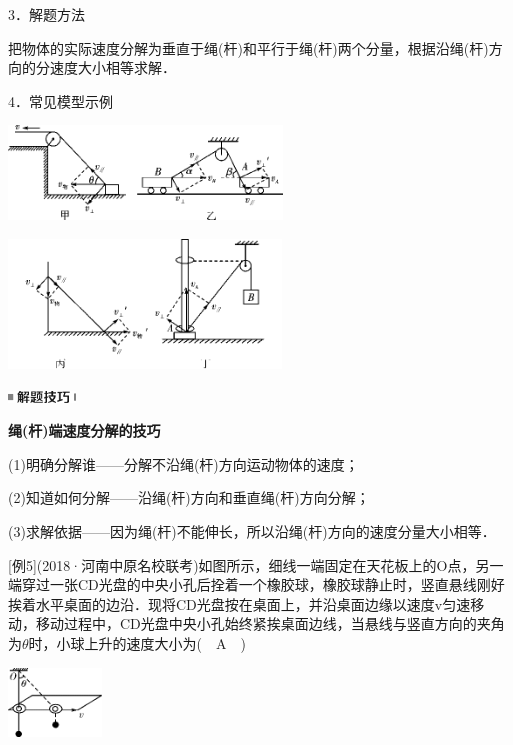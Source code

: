 \documentclass[cn,10.5pt,chinese,mac,chinesefont=founder]{elegantbook}
\begin{document}
3．解题方法

把物体的实际速度分解为垂直于绳(杆)和平行于绳(杆)两个分量，根据沿绳(杆)方向的分速度大小相等求解．

4．常见模型示例

\begin{center}\includegraphics[width=2.86458in,height=0.98958in]{media/image151.png}\end{center}
\begin{center}\includegraphics[width=2.85417in,height=1.35417in]{media/image152.png}\end{center}
\begin{center}\includegraphics[width=0.70833in,height=0.125in]{media/image37.png}

\textbf{绳(杆)端速度分解的技巧}
\end{center}


(1)明确分解谁------分解不沿绳(杆)方向运动物体的速度；

(2)知道如何分解------沿绳(杆)方向和垂直绳(杆)方向分解；

(3)求解依据------因为绳(杆)不能伸长，所以沿绳(杆)方向的速度分量大小相等．

{[}例5{]}(2018·河南中原名校联考)如图所示，细线一端固定在天花板上的O点，另一端穿过一张CD光盘的中央小孔后拴着一个橡胶球，橡胶球静止时，竖直悬线刚好挨着水平桌面的边沿．现将CD光盘按在桌面上，并沿桌面边缘以速度v匀速移动，移动过程中，CD光盘中央小孔始终紧挨桌面边线，当悬线与竖直方向的夹角为$\theta$时，小球上升的速度大小为(　A　)

\begin{center}\includegraphics[width=0.97917in,height=0.72917in]{media/image153.png}\end{center}
\end{document}
